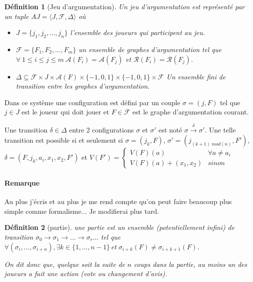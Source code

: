 \documentclass[12pt]{article}
\theoremstyle{defi}
\newtheorem{definition}{Définition}[section]
\theoremstyle{not}
\theoremstyle{prob}
\begin{document}
      \begin{definition}[Jeu d'argumentation]
        Un jeu d'argumentation est représenté par un tuple $AJ=\langle J, \mathcal{F}, \Delta \rangle$ où
        \begin{itemize}
          \item $J = \{j_1, j_2, ..., j_n\}$ l'ensemble des joueurs qui participent au jeu.
          \item $\mathcal{F} = \{F_1, F_2, ..., F_m\}$ un ensemble de graphes d'argumentation tel que $\forall\ 1 \leq i \leq j \leq m\ \mathcal{A}(F_i) = \mathcal{A}(F_j)$ et $\mathcal{R}(F_i) = \mathcal{R}(F_j)$.
          \item $\Delta \subseteq \mathcal{F} \times J \times \mathcal{A}(F) \times \{-1, 0, 1\} \times \{-1, 0, 1\} \times \mathcal{F}$ Un ensemble fini de transition entre les graphes d'argumentation.
        \end{itemize}
      \end{definition}

      Dans ce système une configuration est défini par un couple $\sigma =(j, F)$ tel que $j \in J$ est le joueur qui doit jouer et $F \in \mathcal{F}$ est le graphe d'argumentation courant.

      Une transition $\delta \in \Delta$ entre 2 configurations $\sigma$ et $\sigma'$ est noté $\sigma \overset{\delta}{\longrightarrow} \sigma'$.
      Une telle transition est possible si et seulement si $\sigma = (j_k, F)$, $\sigma' = (j_{(k+1)\ mod(n)}, F')$, $\delta = (F, j_k, a_i, x_1, x_2, F')$ et $V(F') = \left\lbrace
        \begin{array}{ll}
          V(F)(a) & \forall a \neq a_i \\
          V(F)(a) + (x_1, x_2) & sinon
        \end{array}
      \right.$

      \paragraph{Remarque} Au plus j'écris et au plus je me rend compte qu'on peut faire beaucoup plus simple comme formalisme... Je modifierai plus tard.

      \begin{definition}[partie]
        une partie est un ensemble (potentiellement infini) de transition $\sigma_0 \longrightarrow \sigma_1 \longrightarrow \ldots \longrightarrow \sigma_r \ldots$
        tel que
        $\forall (\sigma_i, \ldots, \sigma_{i+n}), \exists k \in \{1, \ldots, n-1\}\ et\ \sigma_{i+k}(F) \neq \sigma_{i+k+1}(F)$.

        On dit donc que, quelque soit la suite de $n$ coups dans la partie, au moins un des joueurs a fait une action (vote ou changement d'avis).
      \end{definition}
\end{document}

